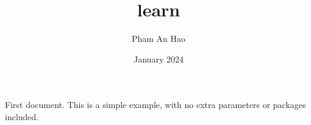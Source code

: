\documentclass{article}
\title{learn}
\author{Pham An Hao}
\date{January 2024}
\begin{document}
First document. This is a simple example, with no 
extra parameters or packages included.
\end{document}
